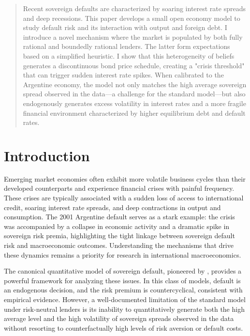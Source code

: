 \begin{abstract}
Recent sovereign defaults are characterized by soaring interest rate spreads and deep recessions. This paper develops a small open economy model to study default risk and its interaction with output and foreign debt. I introduce a novel mechanism where the market is populated by both fully rational and boundedly rational lenders. The latter form expectations based on a simplified heuristic. I show that this heterogeneity of beliefs generates a discontinuous bond price schedule, creating a "crisis threshold" that can trigger sudden interest rate spikes. When calibrated to the Argentine economy, the model not only matches the high average sovereign spread observed in the data—a challenge for the standard model—but also endogenously generates excess volatility in interest rates and a more fragile financial environment characterized by higher equilibrium debt and default rates.
\end{abstract}

\section{Introduction}
\label{sec:introduction}

Emerging market economies often exhibit more volatile business cycles than their developed counterparts and experience financial crises with painful frequency. These crises are typically associated with a sudden loss of access to international credit, soaring interest rate spreads, and deep contractions in output and consumption. The 2001 Argentine default serves as a stark example: the crisis was accompanied by a collapse in economic activity and a dramatic spike in sovereign risk premia, highlighting the tight linkage between sovereign default risk and macroeconomic outcomes. Understanding the mechanisms that drive these dynamics remains a priority for research in international macroeconomics.

The canonical quantitative model of sovereign default, pioneered by \citet{10.1257/aer.98.3.690}, provides a powerful framework for analyzing these issues. In this class of models, default is an endogenous decision, and the risk premium is countercyclical, consistent with empirical evidence. However, a well-documented limitation of the standard model under risk-neutral lenders is its inability to quantitatively generate both the high average level and the high volatility of sovereign spreads observed in the data without resorting to counterfactually high levels of risk aversion or default costs.

